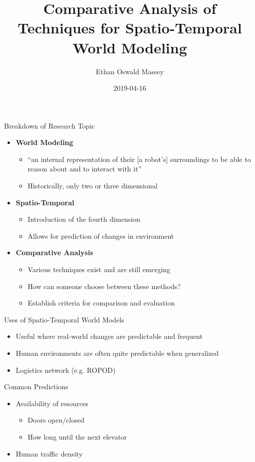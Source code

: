 \documentclass{beamer}
\author[Ethan Oswald Massey]{Ethan Oswald Massey}
\title{Comparative Analysis of Techniques for Spatio-Temporal World Modeling}
\institute[HBRS]{Hochschule Bonn-Rhein-Sieg}
\date{2019-04-16}
\begin{document}
{
\begin{frame}
\titlepage
\end{frame}
}

\begin{frame}[t]{Breakdown of Research Topic}
\begin{itemize}
    \setlength\itemsep{1em}

    \item \textbf{World Modeling}
    \begin{itemize}
      \item “an internal representation of their [a robot's] surroundings to be able to reason
        about and to interact with it”\cite{krajnik2015}
    \item Historically, only two or three dimensional
    \end{itemize}

    \item \textbf{Spatio-Temporal}
    \begin{itemize}
      \item Introduction of the fourth dimension
      \item Allows for prediction of changes in environment
    \end{itemize}

    \item \textbf{Comparative Analysis}
    \begin{itemize}
      \item Various techniques exist and are still emerging
      \item How can someone choose between these methods?
      \item Establish criteria for comparison and evaluation
    \end{itemize}

\end{itemize}
\end{frame}


\begin{frame}[t]{Uses of Spatio-Temporal World Models}
  \begin{itemize}
    \setlength\itemsep{1em}
    \item Useful where real-world changes are predictable and frequent
    \item Human environments are often quite predictable when generalized
    \item Logistics network (e.g. ROPOD)
  \end{itemize}

  \begin{block}{Common Predictions}
    \begin{itemize}
    \item Availability of resources
      \begin{itemize}
        \item Doors open/closed
        \item How long until the next elevator
      \end{itemize}
    \item Human traffic density
    \end{itemize}
  \end{block}
\end{frame}
\end{document}

